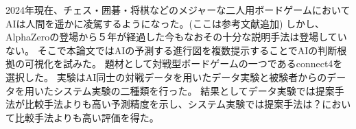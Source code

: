 \abstract
2024年現在、チェス・囲碁・将棋などのメジャーな二人用ボードゲームにおいてAIは人間を遥かに凌駕するようになった。(ここは参考文献追加)
しかし、AlphaZero\cite{AlphaZero}の登場から５年が経過した今もなおその十分な説明手法は登場していない。
そこで本論文ではAIの予測する進行図を複数提示することでAIの判断根拠の可視化を試みた。
題材として対戦型ボードゲームの一つであるconnect4を選択した。
実験はAI同士の対戦データを用いたデータ実験と被験者からのデータを用いたシステム実験の二種類を行った。
結果としてデータ実験では提案手法が比較手法よりも高い予測精度を示し、システム実験では提案手法は？において比較手法よりも高い評価を得た。